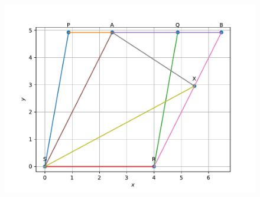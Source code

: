 \begin{enumerate}[label=\thesection.\arabic*,ref=\thesection.\theenumi]
\begin{figure}[!h]
 \includegraphics[width=\columnwidth]{chapters/9/9/2/5/figs/parallelogram1.pdf}
		\caption{}
		\label{fig:9/9/2/5}
  	\end{figure}



\end{enumerate}
